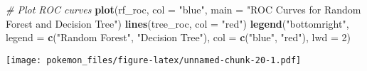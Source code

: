 \documentclass[
]{article}
\newenvironment{Shaded}{\begin{snugshade}}{\end{snugshade}}
\newcommand{\AttributeTok}[1]{\textcolor[rgb]{0.13,0.29,0.53}{#1}}
\newcommand{\CommentTok}[1]{\textcolor[rgb]{0.56,0.35,0.01}{\textit{#1}}}
\newcommand{\DecValTok}[1]{\textcolor[rgb]{0.00,0.00,0.81}{#1}}
\newcommand{\FunctionTok}[1]{\textcolor[rgb]{0.13,0.29,0.53}{\textbf{#1}}}
\newcommand{\NormalTok}[1]{#1}
\newcommand{\StringTok}[1]{\textcolor[rgb]{0.31,0.60,0.02}{#1}}
\begin{document}
\begin{Shaded}
\begin{Highlighting}[]
\CommentTok{\# Plot ROC curves}
\FunctionTok{plot}\NormalTok{(rf\_roc, }\AttributeTok{col =} \StringTok{"blue"}\NormalTok{, }\AttributeTok{main =} \StringTok{"ROC Curves for Random Forest and Decision Tree"}\NormalTok{)}
\FunctionTok{lines}\NormalTok{(tree\_roc, }\AttributeTok{col =} \StringTok{"red"}\NormalTok{)}
\FunctionTok{legend}\NormalTok{(}\StringTok{"bottomright"}\NormalTok{, }\AttributeTok{legend =} \FunctionTok{c}\NormalTok{(}\StringTok{"Random Forest"}\NormalTok{, }\StringTok{"Decision Tree"}\NormalTok{), }\AttributeTok{col =} \FunctionTok{c}\NormalTok{(}\StringTok{"blue"}\NormalTok{, }\StringTok{"red"}\NormalTok{), }\AttributeTok{lwd =} \DecValTok{2}\NormalTok{)}
\end{Highlighting}
\end{Shaded}

\texttt{[image: pokemon\_files/figure-latex/unnamed-chunk-20-1.pdf]}
\end{document}
